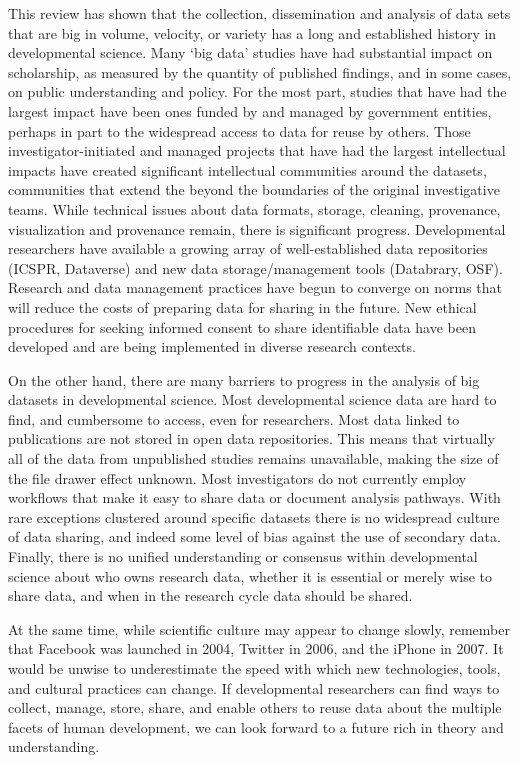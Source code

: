 \documentclass[letterpaper,man,apacite]{apa6}
\begin{document}
This review has shown that the collection, dissemination and analysis of data sets that are big in volume, velocity, or variety has a long and established history in developmental science.
Many `big data' studies have had substantial impact on scholarship, as measured by the quantity of published findings, and in some cases, on public understanding and policy.
For the most part, studies that have had the largest impact have been ones funded by and managed by government entities, perhaps in part to the widespread access to data for reuse by others.
Those investigator-initiated and managed projects that have had the largest intellectual impacts have created significant intellectual communities around the datasets, communities that extend the beyond the boundaries of the original investigative teams.
While technical issues about data formats, storage, cleaning, provenance, visualization and provenance remain, there is significant progress.
Developmental researchers have available a growing array of well-established data repositories (ICSPR, Dataverse) and new data storage/management tools (Databrary, OSF).
Research and data management practices have begun to converge on norms that will reduce the costs of preparing data for sharing in the future.
New ethical procedures for seeking informed consent to share identifiable data have been developed and are being implemented in diverse research contexts.

On the other hand, there are many barriers to progress in the analysis of big datasets in developmental science.
Most developmental science data are hard to find, and cumbersome to access, even for researchers.
Most data linked to publications are not stored in open data repositories. 
This means that virtually all of the data from unpublished studies remains unavailable, making the size of the file drawer effect unknown.
Most investigators do not currently employ workflows that make it easy to share data or document analysis pathways.
With rare exceptions clustered around specific datasets there is no widespread culture of data sharing, and indeed some level of bias against the use of secondary data.
Finally, there is no unified understanding or consensus within developmental science about who owns research data, whether it is essential or merely wise to share data, and when in the research cycle data should be shared.

At the same time, while scientific culture may appear to change slowly, remember that Facebook was launched in 2004, Twitter in 2006, and the iPhone in 2007.
It would be unwise to underestimate the speed with which new technologies, tools, and cultural practices can change.
If developmental researchers can find ways to collect, manage, store, share, and enable others to reuse data about the multiple facets of human development, we can look forward to a future rich in theory and understanding.


\end{document}
